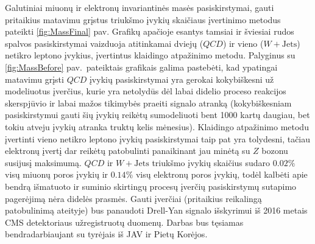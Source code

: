 \documentclass[a4paper, 12pt, oneside]{article}
\newcommand{\WJets}{W\! +\!\mathrm{Jets}}
\newcommand{\QCD}{QC\! D}
\begin{document}
Galutiniai miuonų ir elektronų invariantinės masės pasiskirstymai, gauti pritaikius matavimu grįstus triukšmo įvykių skaičiaus
įvertinimo metodus pateikti \ref{fig:MassFinal} pav.
Grafikų apačioje esantys tamsiai ir šviesiai rudos spalvos pasiskirstymai vaizduoja atitinkamai dviejų ($\QCD$) ir vieno
($\WJets$) netikro leptono įvykius, įvertintus klaidingo atpažinimo metodu.
Palyginus su \ref{fig:MassBefore} pav.\ pateiktais grafikais galima pastebėti, kad ypatingai matavimu grįsti $\QCD$ įvykių
pasiskirstymai yra gerokai kokybiškesni už modeliuotus įverčius, kurie yra netolydūs dėl labai didelio proceso reakcijos
skerspjūvio ir labai mažos tikimybės praeiti signalo atranką (kokybiškesniam pasiskirstymui gauti
šių įvykių reikėtų sumodeliuoti bent 1000 kartų daugiau, bet tokiu atveju įvykių atranka truktų kelis mėnesius).
Klaidingo atpažinimo metodu įvertinti vieno netikro leptono įvykių pasiskirstymai taip pat yra tolydesni,
tačiau elektronų įvertį dar reikėtų patobulinti panaikinant jau minėtą su $Z$ bozonu susijusį maksimumą.
$\QCD$ ir $\WJets$ triukšmo įvykių skaičius sudaro $0.02\%$ visų miuonų poros įvykių ir $0.14\%$ visų elektronų poros įvykių,
todėl kalbėti apie bendrą išmatuoto ir suminio skirtingų procesų įverčių pasiskirstymų sutapimo pagerėjimą nėra didelės prasmės.
Gauti įverčiai (pritaikius reikalingą patobulinimą ateityje) bus panaudoti Drell-Yan signalo išskyrimui iš 2016 metais CMS
detektoriaus užregistruotų duomenų.
Darbas bus tęsiamas bendradarbiaujant su tyrėjais iš JAV ir Pietų Korėjos.

\newpage
\end{document}
